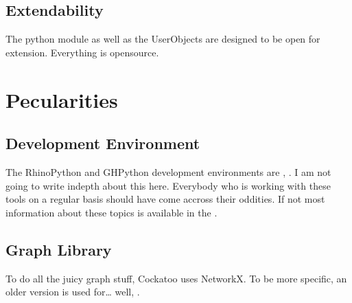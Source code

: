 \documentclass[letterpaper,10pt,english]{sphinxmanual}
\begin{document}
\subsection{Extendability}
\label{\detokenize{README:extendability}}
The python module as well as the UserObjects are designed to be open for
extension. Everything is open\sphinxhyphen{}source.


\section{Pecularities}
\label{\detokenize{README:pecularities}}

\subsection{Development Environment}
\label{\detokenize{README:development-environment}}
The RhinoPython and GHPython development environments are
,
.
I am not going to write in\sphinxhyphen{}depth about this here. Everybody who is
working with these tools on a regular basis should have come accross
their oddities. If not \sphinxhyphen{} most information about these topics is
available in the .


\subsection{Graph Library}
\label{\detokenize{README:graph-library}}
To do all the juicy graph stuff, Cockatoo uses NetworkX. To be more
specific, an older version \sphinxhyphen{}  is used
for… well,
.
\end{document}
